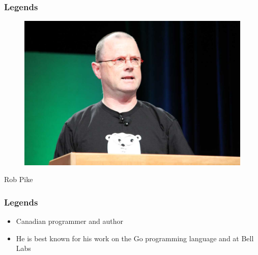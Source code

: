 \documentclass{../c-lecture}
\begin{document}
\begin{frame}
  \frametitle{Legends}
  \begin{figure}
    \includegraphics[height=.75\textheight]{./img/rob.jpg}
  \end{figure}
  \pause%
  \centering
  \color{Violet} Rob Pike
\end{frame}

\begin{frame}
  \frametitle{Legends}
  \begin{itemize}
    \item Canadian programmer and author
    \item
      He is best known for his work on the Go programming language and at Bell
      Labs
  \end{itemize}
\end{frame}
\end{document}
